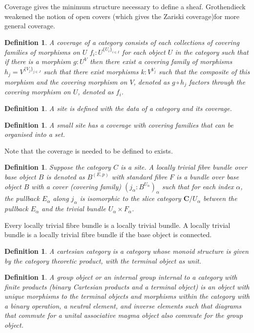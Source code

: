 \documentclass{tufte-book}
\newtheorem{definition}[theorem]{Definition}
\begin{document}
Coverage gives the minimum structure necessary to define a sheaf. Grothendieck weakened the notion of open covers (which gives the Zariski coverage)for more general coverage.

\begin{definition}
	A coverage of a category consists of each collections of covering families of morphisms on $U$ $f_i : U^{\{U_i\}_{i \in I}}$ for each object $U$ in the category such that if there is a morphism $g : U^V$ then there exist a covering family of morphisms $h_j = V^{\{V_j\}_{j \in J}}$
	such that there exist morphisms $k : V^{V_j}$ such that the composite of this morphism and the covering morphism on $V$, denoted as $g \circ h_j$ factors through the covering morphism on $U$, denoted as $f_i$.
\end{definition}

\begin{definition}
	A site is defined with the data of a category and its coverage.
\end{definition}

\begin{definition}
	A small site has a coverage with covering families that can be organised into a set.
\end{definition}

Note that the coverage is needed to be defined to exists.

\begin{definition}
	Suppose the category $C$ is a site.
	A locally trivial fibre bundle over base object $B$ is denoted as $B^{(E, p)}$ with standard fibre $F$ is a bundle over base object $B$ with a cover (covering family) $(j_\alpha : B^{U_\alpha})_\alpha$ such that for each index $\alpha$, the pullback $E_\alpha$ along $j_\alpha$ is isomorphic to the slice category $\mathbf{C} / U_\alpha$ between the pullback $E_\alpha$ and the trivial bundle $U_\alpha \times F_\alpha$.
\end{definition}

Every locally trivial fibre bundle is a locally trivial bundle. A locally trivial bundle is a locally trivial fibre bundle if the base object is connected.

\begin{definition}
	A cartesian category is a category whose monoid structure is given by the category theoretic product, with the terminal object as unit.
\end{definition}

\begin{definition}
	A group object or an internal group internal to a category with finite products (binary Cartesian products and a terminal object) is an object with unique morphisms to the terminal objects and morphisms within the category with a binary operation, a neutral element, and inverse elements such that diagrams that commute for a unital associative magma object also commute for the group object.
\end{definition}
\end{document}
